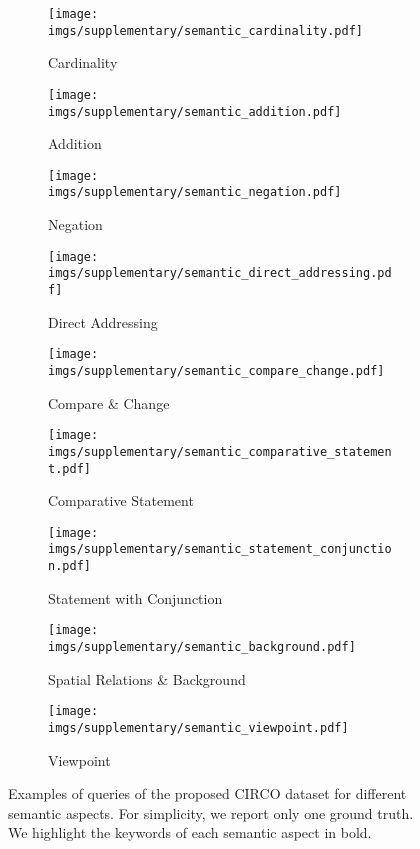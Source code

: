 \documentclass[10pt,twocolumn,letterpaper]{article}
\begin{document}
  \begin{figure*}
  \centering
  \captionsetup[subfigure]{aboveskip=2pt}
  \begin{subfigure}{0.3\linewidth}
    \texttt{[image: imgs/supplementary/semantic\_cardinality.pdf]}
    \caption{Cardinality \vspace{10pt}}
    \label{fig:circo_example_cardinality}
  \end{subfigure}
  \hfill
  \begin{subfigure}{0.3\linewidth}
    \texttt{[image: imgs/supplementary/semantic\_addition.pdf]}
    \caption{Addition \vspace{10pt}}
    \label{fig:circo_example_addition}
  \end{subfigure}
  \hfill
  \begin{subfigure}{0.3\linewidth}
    \texttt{[image: imgs/supplementary/semantic\_negation.pdf]}
    \caption{Negation \vspace{10pt}}
    \label{fig:circo_example_negation}
  \end{subfigure}
  \vspace{10pt}
  \begin{subfigure}{0.3\linewidth}
    \texttt{[image: imgs/supplementary/semantic\_direct\_addressing.pdf]}
    \caption{Direct Addressing}
    \label{fig:circo_example_direct_addressing}
  \end{subfigure}
  \hfill
  \begin{subfigure}{0.3\linewidth}
    \texttt{[image: imgs/supplementary/semantic\_compare\_change.pdf]}
    \caption{Compare \& Change}
    \label{fig:circo_example_compare_change}
  \end{subfigure}
  \hfill
  \begin{subfigure}{0.3\linewidth}
    \texttt{[image: imgs/supplementary/semantic\_comparative\_statement.pdf]}
    \caption{Comparative Statement}
    \label{fig:circo_example_comparative_statement}
  \end{subfigure}
  \begin{subfigure}{0.3\linewidth}
    \texttt{[image: imgs/supplementary/semantic\_statement\_conjunction.pdf]}
    \caption{Statement with Conjunction}
    \label{fig:circo_example_statement_conjunction}
  \end{subfigure}
  \hfill
  \begin{subfigure}{0.3\linewidth}
    \texttt{[image: imgs/supplementary/semantic\_background.pdf]}
    \caption{Spatial Relations \& Background}
    \label{fig:circo_example_background}
  \end{subfigure}
  \hfill
  \begin{subfigure}{0.3\linewidth}
    \texttt{[image: imgs/supplementary/semantic\_viewpoint.pdf]}
    \caption{Viewpoint}
    \label{fig:circo_example_viewpoint}
  \end{subfigure}
  \caption{Examples of queries of the proposed CIRCO dataset for different semantic aspects. For simplicity, we report only one ground truth. We highlight the keywords of each semantic aspect in bold.}
  \label{fig:circo_semantic_examples}
\end{figure*}
\end{document}
